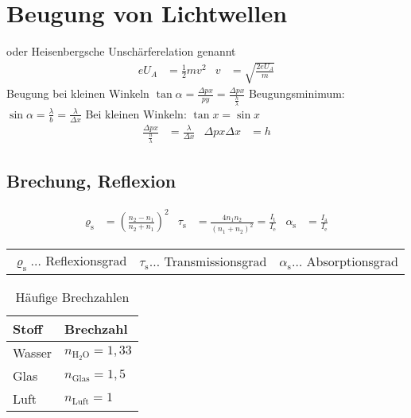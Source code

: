 	\section{Beugung von Lichtwellen}
		oder Heisenbergsche Unschärferelation genannt
		\begin{align*}
			e U_A &= \frac12 m v^2 & v &= \sqrt{\frac{2eU_A}{m}}
		\end{align*}
		Beugung bei kleinen Winkeln $\tan \alpha = \frac{\Delta px}{py} = \frac{\Delta px}{\frac{h}{\lambda}} $\newline
		Beugungsminimum: $\sin \alpha = \frac{\lambda}{b} = \frac{\lambda}{\Delta x}$ \newline
		Bei kleinen Winkeln: $\tan x  = \sin x $ \newline
		\begin{align*}
			\frac{\Delta px}{\frac{h}{\lambda}} &= \frac{\lambda}{\Delta x} & \Delta px \Delta x &= h
		\end{align*}

		\subsection{Brechung, Reflexion}
			\begin{align*}
				\varrho_{\mathrm{s}}&=\left(\frac{n_2-n_1}{n_2+n_1}\right)^2 
				& \tau_{\mathrm{s}}&=\frac{4n_1n_2}{(n_1+n_2)^2}=\frac{I_{\mathrm{t}}}{I_{\mathrm{e}}}
				& \alpha_{\mathrm{s}}&=\frac{I_{\mathrm{a}}}{I_{\mathrm{e}}}
			\end{align*}

			\begin{table}[h]
			\begin{tabular}{lll}
			$\varrho_{\mathrm{s}}\dots$ Reflexionsgrad & $\tau_{\mathrm{s}}\dots$ Transmissionsgrad & $\alpha_{\mathrm{s}}\dots$ Absorptionsgrad\\
			\end{tabular}
			\end{table}
			\begin{table}[h]
			\begin{tabular}{ll}
			Stoff & Brechzahl\\
			\toprule
			Wasser & $n_{\mathrm{H_2O}}=1,33$\\
			Glas & $n_{\mathrm{Glas}}=1,5$\\
			Luft & $n_{\mathrm{Luft}}=1$\\
			\end{tabular}
			\caption{Häufige Brechzahlen}
			\end{table}

